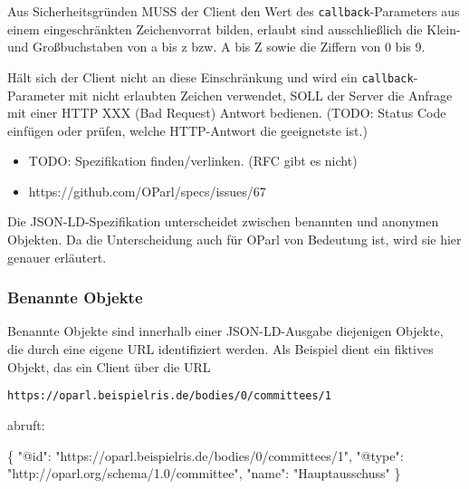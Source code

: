 \documentclass[,a4paper]{article}
\newenvironment{Shaded}{}{}
\newcommand{\DataTypeTok}[1]{\textcolor[rgb]{0.56,0.13,0.00}{{#1}}}
\newcommand{\StringTok}[1]{\textcolor[rgb]{0.25,0.44,0.63}{{#1}}}
\newcommand{\NormalTok}[1]{{#1}}
\begin{document}
Aus Sicherheitsgründen MUSS der Client den Wert des
\texttt{callback}-Parameters aus einem eingeschränkten Zeichenvorrat
bilden, erlaubt sind ausschließlich die Klein- und Großbuchstaben von a
bis z bzw. A bis Z sowie die Ziffern von 0 bis 9.

Hält sich der Client nicht an diese Einschränkung und wird ein
\texttt{callback}-Parameter mit nicht erlaubten Zeichen verwendet, SOLL
der Server die Anfrage mit einer HTTP XXX (Bad Request) Antwort
bedienen. (TODO: Status Code einfügen oder prüfen, welche HTTP-Antwort
die geeignetste ist.)

\begin{itemize}
\itemsep1pt\parskip0pt
\item
  TODO: Spezifikation finden/verlinken. (RFC gibt es nicht)
\item
  https://github.com/OParl/specs/issues/67
\end{itemize}


Die JSON-LD-Spezifikation unterscheidet zwischen benannten und anonymen
Objekten. Da die Unterscheidung auch für OParl von Bedeutung ist, wird
sie hier genauer erläutert.

\subsubsection{Benannte Objekte}\label{benannte-objekte}

Benannte Objekte sind innerhalb einer JSON-LD-Ausgabe diejenigen
Objekte, die durch eine eigene URL identifiziert werden. Als Beispiel
dient ein fiktives Objekt, das ein Client über die URL

\begin{verbatim}
https://oparl.beispielris.de/bodies/0/committees/1
\end{verbatim}

abruft:

\begin{Shaded}
\begin{Highlighting}[]
\NormalTok{\{}
    \DataTypeTok{"@id"}\NormalTok{: }\StringTok{"https://oparl.beispielris.de/bodies/0/committees/1"}\NormalTok{,}
    \DataTypeTok{"@type"}\NormalTok{: }\StringTok{"http://oparl.org/schema/1.0/committee"}\NormalTok{,}
    \DataTypeTok{"name"}\NormalTok{: }\StringTok{"Hauptausschuss"}
\NormalTok{\}}
\end{Highlighting}
\end{Shaded}
\end{document}
